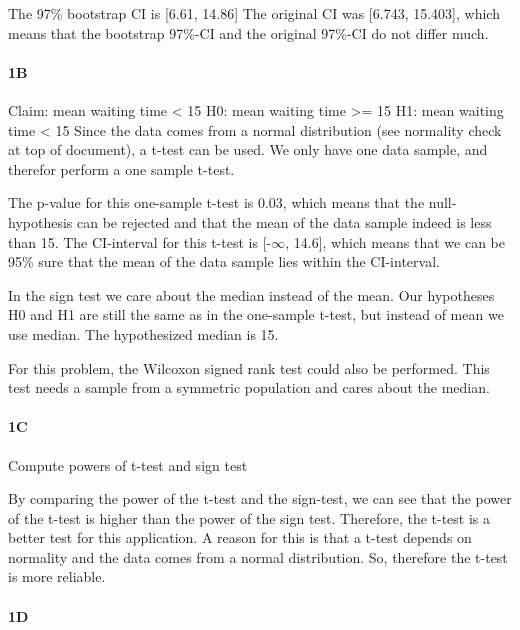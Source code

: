 \documentclass[
]{article}
\begin{document}
The 97\% bootstrap CI is {[}6.61, 14.86{]} The original CI was {[}6.743,
15.403{]}, which means that the bootstrap 97\%-CI and the original
97\%-CI do not differ much.

\hypertarget{b}{%
\paragraph{\texorpdfstring{\textbf{1B}}{1B}}\label{b}}

Claim: mean waiting time \textless{} 15 H0: mean waiting time
\textgreater= 15 H1: mean waiting time \textless{} 15 Since the data
comes from a normal distribution (see normality check at top of
document), a t-test can be used. We only have one data sample, and
therefor perform a one sample t-test.

The p-value for this one-sample t-test is 0.03, which means that the
null-hypothesis can be rejected and that the mean of the data sample
indeed is less than 15. The CI-interval for this t-test is
{[}-\(\infty\), 14.6{]}, which means that we can be 95\% sure that the
mean of the data sample lies within the CI-interval.

In the sign test we care about the median instead of the mean. Our
hypotheses H0 and H1 are still the same as in the one-sample t-test, but
instead of mean we use median. The hypothesized median is 15.

For this problem, the Wilcoxon signed rank test could also be performed.
This test needs a sample from a symmetric population and cares about the
median.

\hypertarget{c}{%
\paragraph{\texorpdfstring{\textbf{1C}}{1C}}\label{c}}

Compute powers of t-test and sign test

By comparing the power of the t-test and the sign-test, we can see that
the power of the t-test is higher than the power of the sign test.
Therefore, the t-test is a better test for this application. A reason
for this is that a t-test depends on normality and the data comes from a
normal distribution. So, therefore the t-test is more reliable.

\hypertarget{d}{%
\paragraph{\texorpdfstring{\textbf{1D}}{1D}}\label{d}}
\end{document}
